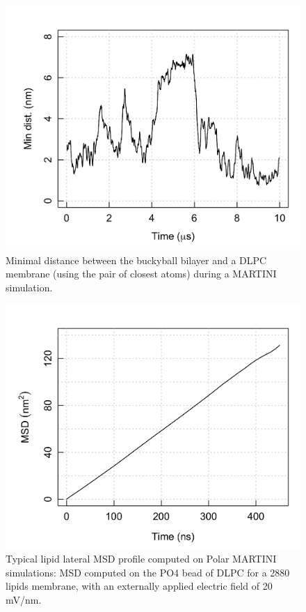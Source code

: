 \begin{figure}[h!]
\centering
\vspace{1cm}
\includegraphics[width=0.6\linewidth]{3results_capsule/pics/mindist_dlpc_MARTINI.png}
\caption[(SI) Minimal distance buckyball bilayer - DLPC membrane (MARTINI)]{Minimal distance between the buckyball bilayer and a DLPC membrane (using the pair of closest atoms) during a MARTINI simulation.}
\label{fig:mindist_buck_dlpc}
\end{figure}

\begin{figure}[h!]
\centering
\includegraphics[width=0.6\linewidth]{3results_capsule/pics/msd_MARTINI.png}
\caption[(SI) Typical lipid lateral MSD profile in MARTINI simulations.]{Typical lipid lateral MSD profile computed on Polar MARTINI simulations: MSD computed on the PO4 bead of DLPC for a 2880 lipids membrane, with an externally applied electric field of 20 mV/nm.}
\label{fig:MSD_martini}
\end{figure}

